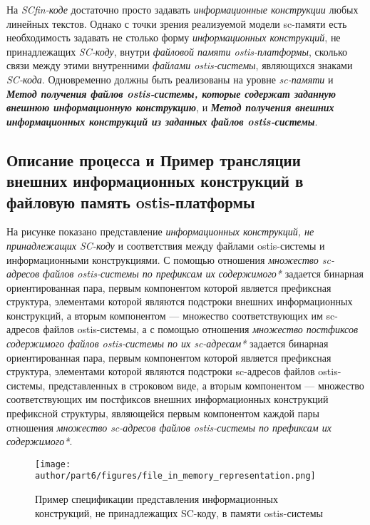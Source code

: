На \textit{SCfin-коде} достаточно просто задавать \textit{информационные конструкции} любых линейных текстов. Однако с точки зрения реализуемой модели sc-памяти есть необходимость задавать не столько форму \textit{информационных конструкций}, не принадлежащих \textit{SC-коду}, внутри \textit{файловой памяти ostis-платформы}, сколько связи между этими внутренними \textit{файлами ostis-системы}, являющихся знаками \textit{SC-кода}. Одновременно должны быть реализованы на уровне \textit{sc-памяти} и \textbf{\textit{Метод получения файлов ostis-системы, которые содержат заданную внешнюю информационную конструкцию}}, и \textbf{\textit{Метод получения внешних информационных конструкций из заданных файлов ostis-системы}}.

\subsection{Описание процесса и Пример трансляции внешних информационных конструкций в файловую память ostis-платформы}
\label{sec_soft_platform_scfin_code_example}

На рисунке  показано представление \textit{информационных конструкций, не принадлежащих SC-коду} и соответствия между файлами ostis-системы и информационными конструкциями. С помощью отношения \textit{множество sc-адресов файлов ostis-системы по префиксам их содержимого*} задается бинарная ориентированная пара, первым компонентом которой является префиксная структура, элементами которой являются подстроки внешних информационных конструкций, а вторым компонентом --- множество соответствующих им sc-адресов файлов ostis-системы, а с помощью отношения \textit{множество постфиксов содержимого файлов ostis-системы по их sc-адресам*} задается бинарная ориентированная пара, первым компонентом которой является префиксная структура, элементами которой являются подстроки sc-адресов файлов ostis-системы, представленных в строковом виде, а вторым компонентом --- множество соответствующих им постфиксов внешних информационных конструкций префиксной структуры, являющейся первым компонентом каждой пары отношения \textit{множество sc-адресов файлов ostis-системы по префиксам их содержимого*}.

\begin{figure*}[htbp]
	\center
	\texttt{[image: author/part6/figures/file\_in\_memory\_representation.png]}
	\caption{Пример спецификации представления информационных конструкций, не принадлежащих SC-коду, в памяти ostis-системы}
	\label{fig:file_in_memory_representation}
\end{figure*}

